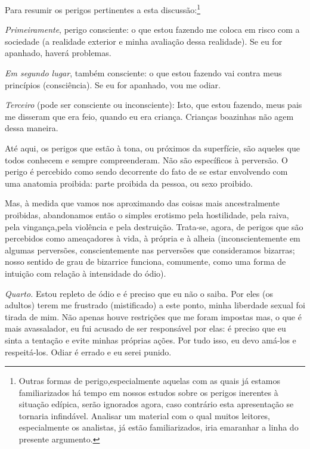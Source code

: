 Para resumir os perigos pertinentes a esta discussão:\footnote{ Outras
formas de perigo,\idxperigofor[|(] especialmente aquelas com as quais já estamos
familiarizados há tempo em nossos estudos sobre os perigos inerentes à
situação edípica, serão ignorados agora, caso contrário esta
apresentação se tornaria infindável. Analisar um material com o qual
muitos leitores, especialmente os analistas, já estão familiarizados,
iria emaranhar a linha do presente argumento.}

\textit{Primeiramente}, perigo consciente: o que estou fazendo me
coloca em risco com a sociedade (a realidade exterior e minha avaliação
dessa realidade). Se eu for apanhado, haverá problemas.

\textit{Em segundo lugar}, também consciente: o que estou fazendo
vai contra meus princípios (consciência). Se eu for apanhado, vou me
odiar.

\textit{Terceiro} (pode ser consciente ou inconsciente): Isto, que
estou fazendo, meus pais me disseram que era feio, quando eu era
criança. Crianças boazinhas não agem dessa maneira.

Até aqui, os perigos que estão à tona, ou próximos da superfície,
são aqueles que todos conhecem e sempre compreenderam. Não são
específicos à perversão. O perigo é percebido como sendo decorrente do
fato de se estar envolvendo com uma anatomia proibida: parte proibida
da pessoa, ou sexo proibido.

Mas, à medida que vamos nos aproximando das coisas mais ancestralmente
proibidas, abandonamos então o simples erotismo pela hostilidade,\idxperigohos{} pela
raiva, pela vingança,\idxvinga[|)] pela violência e pela destruição. Trata-se,
agora, de perigos que são percebidos como ameaçadores à vida, à própria
e à alheia (inconscientemente em algumas perversões, conscientemente
nas perversões que consideramos bizarras; nosso sentido de grau de
bizarrice funciona, comumente, como uma forma de intuição com relação à
intensidade do ódio).

\textit{Quarto.} Estou repleto de ódio e é preciso que eu não o
saiba. Por eles (os adultos) terem me frustrado (mistificado) a este
ponto, minha liberdade sexual foi tirada de mim. Não apenas houve
restrições que me foram impostas mas, o que é mais avassalador, eu fui
acusado de ser responsável por elas: é preciso que eu sinta a tentação
e evite minhas próprias ações. Por tudo isso, eu devo amá-los e
respeitá-los. Odiar é errado e eu serei punido.

